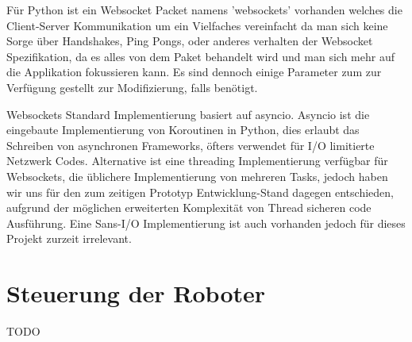 Für Python ist ein Websocket Packet namens 'websockets' vorhanden welches die Client-Server Kommunikation
um ein Vielfaches vereinfacht da man sich keine Sorge über Handshakes, Ping Pongs, oder anderes verhalten
der Websocket Spezifikation, da es alles von dem Paket behandelt wird 
und man sich mehr auf die Applikation fokussieren kann. 
Es sind dennoch einige Parameter zum zur Verfügung gestellt zur Modifizierung, falls benötigt.

Websockets Standard Implementierung basiert auf asyncio.
%  
Asyncio ist die eingebaute Implementierung von Koroutinen in Python,
dies erlaubt das Schreiben von asynchronen Frameworks, 
öfters verwendet für I/O limitierte Netzwerk Codes.
Alternative ist eine threading Implementierung verfügbar für Websockets, 
die üblichere Implementierung von mehreren Tasks, 
jedoch haben wir uns für den zum zeitigen Prototyp Entwicklung-Stand dagegen entschieden,
aufgrund der möglichen erweiterten Komplexität von Thread sicheren code Ausführung.
Eine Sans-I/O Implementierung ist auch vorhanden jedoch für dieses Projekt zurzeit irrelevant.






\section{Steuerung der Roboter}
\label{subsec:backend_robot_detection}
TODO 
